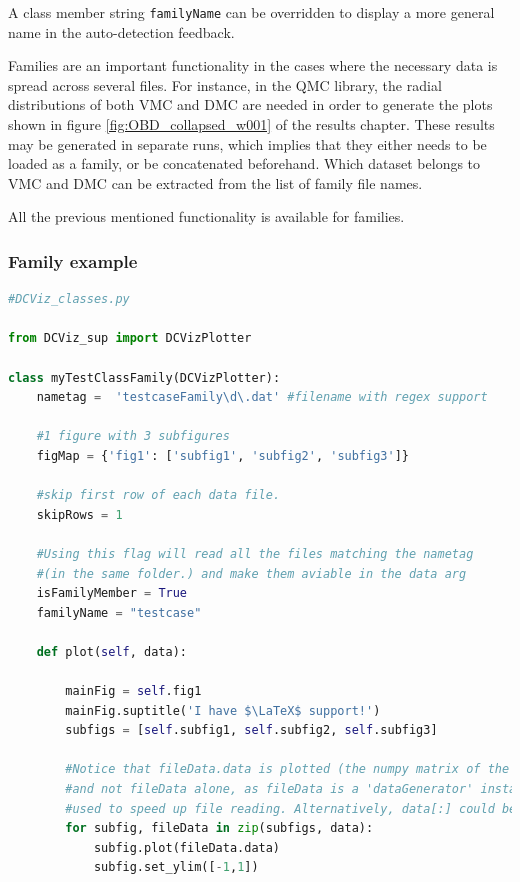 A class member string \verb+familyName+ can be overridden to display a more general name in the auto-detection feedback. 

Families are an important functionality in the cases where the necessary data is spread across several files. For instance, in the QMC library, the radial distributions of both VMC and DMC are needed in order to generate the plots shown in figure \ref{fig:OBD_collapsed_w001} of the results chapter. These results may be generated in separate runs, which implies that they either needs to be loaded as a family, or be concatenated beforehand. Which dataset belongs to VMC and DMC can be extracted from the list of family file names.

All the previous mentioned functionality is available for families.


\subsubsection{Family example}

\vspace{0.5cm}
\begin{lstlisting}[language=Python, otherkeywords={self}]
#DCViz_classes.py

from DCViz_sup import DCVizPlotter

class myTestClassFamily(DCVizPlotter):
    nametag =  'testcaseFamily\d\.dat' #filename with regex support
    
    #1 figure with 3 subfigures
    figMap = {'fig1': ['subfig1', 'subfig2', 'subfig3']}
    
    #skip first row of each data file.
    skipRows = 1    

    #Using this flag will read all the files matching the nametag
    #(in the same folder.) and make them aviable in the data arg    
    isFamilyMember = True
    familyName = "testcase"
    
    def plot(self, data):
        
        mainFig = self.fig1
        mainFig.suptitle('I have $\LaTeX$ support!')        
        subfigs = [self.subfig1, self.subfig2, self.subfig3]
    
        #Notice that fileData.data is plotted (the numpy matrix of the columns) 
        #and not fileData alone, as fileData is a 'dataGenerator' instance 
        #used to speed up file reading. Alternatively, data[:] could be sent
        for subfig, fileData in zip(subfigs, data):
            subfig.plot(fileData.data)
            subfig.set_ylim([-1,1])
\end{lstlisting}

